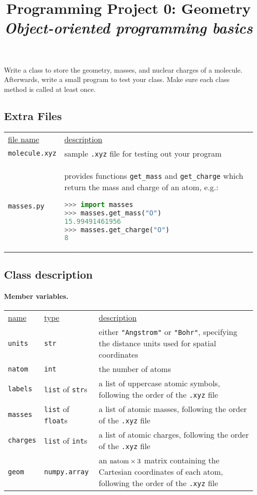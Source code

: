 \documentclass[fleqn]{article}
\title{Programming Project 0: Geometry\\
\textit{Object-oriented programming basics}}
\author{}
\date{}
\newcommand{\linl}[1]{\lstinline{#1}{}}
\newcommand{\ul}[1]{\underline{#1}}
\begin{document}
\maketitle
\vspace{-1cm}
\noindent
Write a class to store the geometry, masses, and nuclear charges of a molecule.
Afterwards, write a small program to test your class.
Make sure each class method is called at least once.

\subsection*{Extra Files}
\begin{center}
\begin{tabular}{p{}@{}p{}}
  \ul{file name} & \ul{description} \\
  \linl{molecule.xyz}
  & sample \linl{.xyz} file for testing out your program \\ 
  \linl{masses.py}
  & provides functions \linl{get_mass} and \linl{get_charge} which return the mass and charge of an atom, e.g.:
  \begin{lstlisting}[language=python]
>>> import masses
>>> masses.get_mass("O")
15.99491461956
>>> masses.get_charge("O")
8
\end{lstlisting}
\end{tabular}
\end{center}

\subsection*{Class description}

\paragraph{Member variables.}
\begin{center}
\begin{tabular}{p{}@{}p{}@{}p{}}
  \ul{name} & \ul{type} & \ul{description} \\
  \linl{units}   & \linl{str}
  & either \linl{"Angstrom"} or \linl{"Bohr"}, specifying the distance units used for spatial coordinates\\
  \linl{natom}   & \linl{int}
  & the number of atoms\\
  \linl{labels}  & \linl{list} of \linl{str}s
  & a list of uppercase atomic symbols, following the order of the \linl{.xyz} file\\
  \linl{masses}  & \linl{list} of \linl{float}s
  & a list of atomic masses, following the order of the \linl{.xyz} file\\
  \linl{charges} & \linl{list} of \linl{int}s
  & a list of atomic charges, following the order of the \linl{.xyz} file\\
  \linl{geom}    & \linl{numpy.array}
  & an $\text{\linl{natom}}\times3$ matrix containing the Cartesian coordinates of each atom, following the order of the \linl{.xyz} file
\end{tabular}
\end{center}
\end{document}

